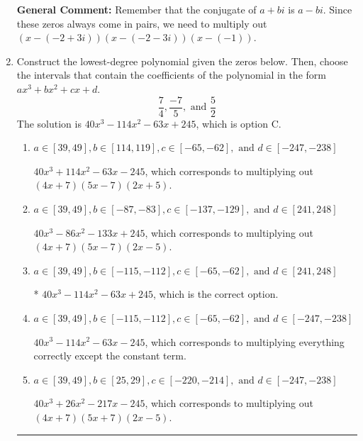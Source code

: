 \documentclass{extbook}[14pt]
\newcommand{\litem}[1]{\item #1

\rule{\textwidth}{0.4pt}}
\begin{document}
\begin{enumerate}
{\textbf{General Comment:} Remember that the conjugate of $a+bi$ is $a-bi$. Since these zeros always come in pairs, we need to multiply out $(x-(-2 + 3 i))(x-(-2 - 3 i))(x-(-1))$.
}
\litem{
Construct the lowest-degree polynomial given the zeros below. Then, choose the intervals that contain the coefficients of the polynomial in the form $ax^3+bx^2+cx+d$.
\[ \frac{7}{4}, \frac{-7}{5}, \text{ and } \frac{5}{2} \]The solution is \( 40x^{3} -114 x^{2} -63 x + 245 \), which is option C.\begin{enumerate}[label=\Alph*.]
\item \( a \in [39, 49], b \in [114, 119], c \in [-65, -62], \text{ and } d \in [-247, -238] \)

$40x^{3} +114 x^{2} -63 x -245$, which corresponds to multiplying out $(4x + 7)(5x -7)(2x + 5)$.
\item \( a \in [39, 49], b \in [-87, -83], c \in [-137, -129], \text{ and } d \in [241, 248] \)

$40x^{3} -86 x^{2} -133 x + 245$, which corresponds to multiplying out $(4x + 7)(5x -7)(2x -5)$.
\item \( a \in [39, 49], b \in [-115, -112], c \in [-65, -62], \text{ and } d \in [241, 248] \)

* $40x^{3} -114 x^{2} -63 x + 245$, which is the correct option.
\item \( a \in [39, 49], b \in [-115, -112], c \in [-65, -62], \text{ and } d \in [-247, -238] \)

$40x^{3} -114 x^{2} -63 x -245$, which corresponds to multiplying everything correctly except the constant term.
\item \( a \in [39, 49], b \in [25, 29], c \in [-220, -214], \text{ and } d \in [-247, -238] \)

$40x^{3} +26 x^{2} -217 x -245$, which corresponds to multiplying out $(4x + 7)(5x + 7)(2x -5)$.
\end{enumerate}

}
\end{enumerate}
\end{document}
